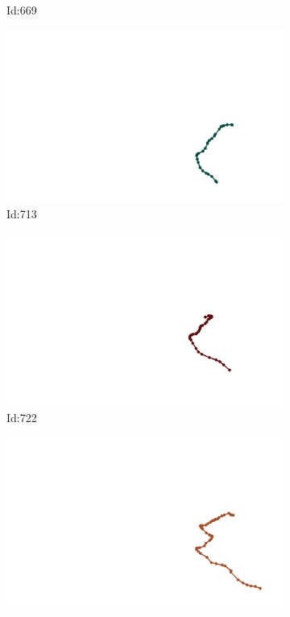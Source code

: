 \documentclass[12pt,twoside]{report}
\begin{document}
\begin{figure}
\begin{subfigure}[b]{0.20\textwidth}
\caption{Id:669}
\end{subfigure}
\begin{subfigure}[b]{0.20\textwidth}
\centering
\includegraphics[width=\textwidth]{../trajectories/713.png}
\caption{Id:713}
\end{subfigure}
\begin{subfigure}[b]{0.20\textwidth}
\centering
\includegraphics[width=\textwidth]{../trajectories/722.png}
\caption{Id:722}
\end{subfigure}
\begin{subfigure}[b]{0.20\textwidth}
\centering
\includegraphics[width=\textwidth]{../trajectories/747.png}

\end{subfigure}
\end{figure}
\end{document}
